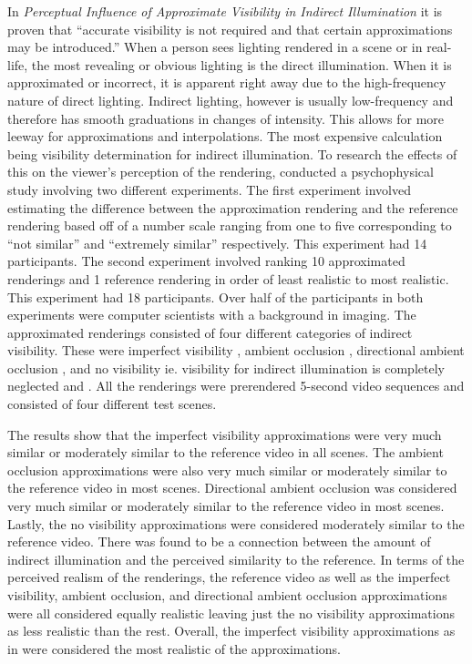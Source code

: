 In \textit{Perceptual Influence of Approximate Visibility in Indirect Illumination} \cite{Yu2009} it is proven that “accurate visibility is not required and that certain approximations may be introduced.”  When a person sees lighting rendered in a scene or in real-life, the most revealing or obvious lighting is the direct illumination.  When it is approximated or incorrect, it is apparent right away due to the high-frequency nature of direct lighting.  Indirect lighting, however is usually low-frequency and therefore has smooth graduations in changes of intensity.  This allows for more leeway for approximations and interpolations.  The most expensive calculation being visibility determination for indirect illumination.    To research the effects of this on the viewer's perception of the rendering, \cite{Yu2009} conducted a psychophysical study involving two different experiments.  The first experiment involved estimating the difference between the approximation rendering and the reference rendering based off of a number scale ranging from one to five corresponding to “not similar” and “extremely similar” respectively.  This experiment had 14 participants.  The second experiment involved ranking 10 approximated renderings and 1 reference rendering in order of least realistic to most realistic.  This experiment had 18 participants.  Over half of the participants in both experiments were computer  scientists with a background in imaging.  The approximated renderings consisted of four different categories of indirect visibility.  These were imperfect visibility \cite{Ritschel2008}, ambient occlusion \cite{Zhukov1998}, directional ambient occlusion \cite{Sloan2007} \cite{Ritschel2009}, and no visibility ie. visibility for indirect illumination is completely neglected \cite{Dachsbacher2005} and \cite{Dachsbacher2006}.  All the renderings were prerendered 5-second video sequences and consisted of four different test scenes.

The results show that the imperfect visibility approximations were very much similar or moderately similar to the reference video in all scenes.  The ambient occlusion approximations were also very much similar or moderately similar to the reference video in most scenes.  Directional ambient occlusion was considered very much similar or moderately similar to the reference video in most scenes.  Lastly, the no visibility approximations were considered moderately similar to the reference video.  There was found to be a connection between the amount of indirect illumination and the perceived similarity to the reference.  In terms of the perceived realism of the renderings, the reference video as well as the imperfect visibility, ambient occlusion, and directional ambient occlusion approximations were all considered equally realistic leaving just the no visibility approximations as less realistic than the rest.  Overall, the imperfect visibility approximations as in \cite{Ritschel2008} were considered the most realistic of the approximations.


